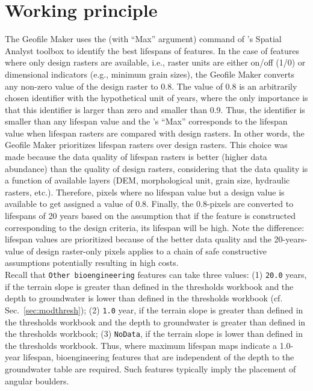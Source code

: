 
\section{Working principle}\label{sec:actprin}

The Geofile Maker uses the  (with ``Max'' argument) command of 's Spatial Analyst toolbox to identify the best lifespans of features. In the case of features where only design rasters are available, i.e., raster units are either on/off (1/0) or dimensional indicators (e.g., minimum grain sizes), the Geofile Maker converts any non-zero value of the design raster to 0.8. The value of 0.8 is an arbitrarily chosen identifier with the hypothetical unit of years, where the only importance is that this identifier is larger than zero and smaller than 0.9. Thus, the identifier is smaller than any lifespan value and the 's ``Max'' corresponds to the lifespan value when lifespan rasters are compared with design rasters. In other words, the Geofile Maker prioritizes lifespan rasters over design rasters. This choice was made because the data quality of lifespan rasters is better (higher data abundance) than the quality of design rasters, considering that the data quality is a function of available layers (DEM, morphological unit, grain size, hydraulic rasters, etc.). Therefore, pixels where no lifespan value but a design value is available to get assigned a value of 0.8. Finally, the 0.8-pixels are converted to lifespans of 20 years based on the assumption that if the feature is constructed corresponding to the design criteria, its lifespan will be high. Note the difference: lifespan values are prioritized because of the better data quality and the 20-years-value of design raster-only pixels applies to a chain of safe constructive assumptions potentially resulting in high costs.\\

Recall that \texttt{Other bioengineering} features can take three values: (1) \texttt{20.0} years, if the terrain slope is greater than defined in the thresholds workbook and the depth to groundwater is lower than defined in the thresholds workbook (cf. Sec.~\ref{sec:modthresh}); (2) \texttt{1.0} year, if the terrain slope is greater than defined in the thresholds workbook and the depth to groundwater is greater than defined in the thresholds workbook; (3) \texttt{NoData}, if the terrain slope is lower than defined in the thresholds workbook. Thus, where maximum lifespan maps indicate a 1.0-year lifespan, bioengineering features that are independent of the depth to the groundwater table are required. Such features typically imply the placement of angular boulders.



